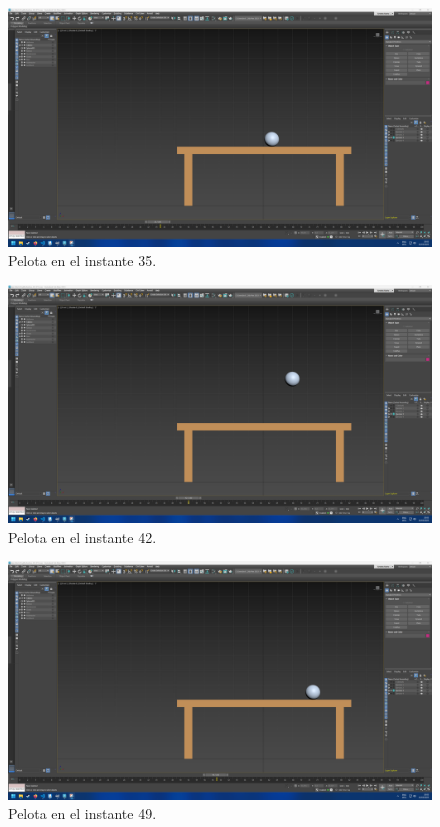\documentclass{article}
\begin{document}
\begin{figure}[H]
    \centering
    \includegraphics[width=\textwidth]{imagenes/Ejercicio3/keyframes/35.png}
    \caption{Pelota en el instante 35.}
\end{figure}
\begin{figure}[H]
    \centering
    \includegraphics[width=\textwidth]{imagenes/Ejercicio3/keyframes/42.png}
    \caption{Pelota en el instante 42.}
\end{figure}
\begin{figure}[H]
    \centering
    \includegraphics[width=\textwidth]{imagenes/Ejercicio3/keyframes/49.png}
    \caption{Pelota en el instante 49.}
\end{figure}
\end{document}
